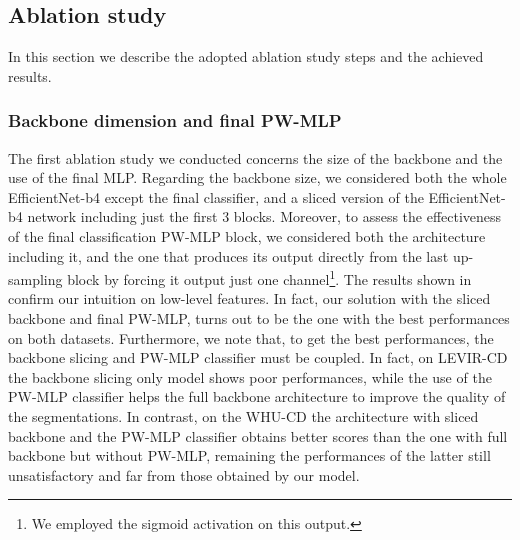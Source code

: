 

\subsection{Ablation study}
\label{ch:ablation}

In this section we describe the adopted ablation study steps and the achieved results.

\subsubsection{Backbone dimension and final PW-MLP}

The first ablation study we conducted concerns the size of the backbone and the use of the final MLP. 
Regarding the backbone size, we considered both the whole EfficientNet-b4 except the final classifier, 
and a sliced version of the EfficientNet-b4 network including just the first 3 blocks.
Moreover, to assess the effectiveness of the final classification PW-MLP block, 
we considered both the architecture including it, 
and the one that produces its output directly from the last up-sampling block by forcing it output just one channel\footnote{
    We employed the sigmoid activation on this output.
}.
The results shown in  confirm our intuition on low-level features.
In fact, our solution with the sliced backbone and final PW-MLP, turns out to be the one with the best performances on both datasets.
Furthermore, we note that, to get the best performances, the backbone slicing and PW-MLP classifier must be coupled.
In fact, on LEVIR-CD the backbone slicing only model shows poor performances, 
while the use of the PW-MLP classifier helps the full backbone architecture to improve the quality of the segmentations.
In contrast, on the WHU-CD the architecture with sliced backbone and the PW-MLP classifier obtains better scores 
than the one with full backbone but without PW-MLP, remaining the performances of the latter still unsatisfactory and far from those obtained by our model.


